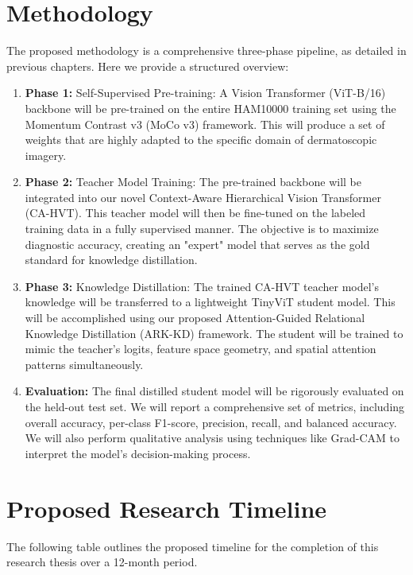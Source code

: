 \section{Methodology}
The proposed methodology is a comprehensive three-phase pipeline, as detailed in previous chapters. Here we provide a structured overview:

\begin{enumerate}
    \item \textbf{Phase 1:} Self-Supervised Pre-training: A Vision Transformer (ViT-B/16) backbone will be pre-trained on the entire HAM10000 training set using the Momentum Contrast v3 (MoCo v3) framework. This will produce a set of weights that are highly adapted to the specific domain of dermatoscopic imagery.
    
    \item \textbf{Phase 2:} Teacher Model Training: The pre-trained backbone will be integrated into our novel Context-Aware Hierarchical Vision Transformer (CA-HVT). This teacher model will then be fine-tuned on the labeled training data in a fully supervised manner. The objective is to maximize diagnostic accuracy, creating an "expert" model that serves as the gold standard for knowledge distillation.
 
    \item \textbf{Phase 3:} Knowledge Distillation: The trained CA-HVT teacher model's knowledge will be transferred to a lightweight TinyViT student model. This will be accomplished using our proposed Attention-Guided Relational Knowledge Distillation (ARK-KD) framework. The student will be trained to mimic the teacher's logits, feature space geometry, and spatial attention patterns simultaneously.

    \item \textbf{Evaluation:} The final distilled student model will be rigorously evaluated on the held-out test set. We will report a comprehensive set of metrics, including overall accuracy, per-class F1-score, precision, recall, and balanced accuracy. We will also perform qualitative analysis using techniques like Grad-CAM to interpret the model's decision-making process.

\end{enumerate}
\section{Proposed Research Timeline}
\noindent The following table outlines the proposed timeline for the completion of this research thesis over a 12-month period.\\



